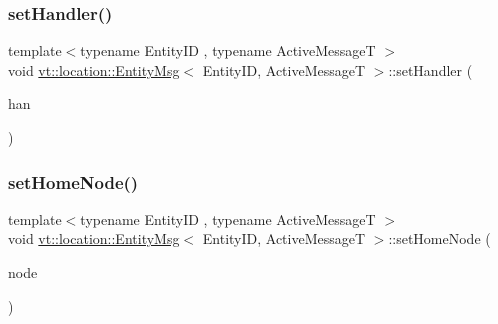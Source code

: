 \mbox{\label{structvt_1_1location_1_1_entity_msg_a343ec9990f43b1f2e0bf6b883e7ae507}} 
\subsubsection{\texorpdfstring{set\+Handler()}{setHandler()}}
{\footnotesize\ttfamily template$<$typename Entity\+ID , typename Active\+MessageT $>$ \\
void \hyperlink{structvt_1_1location_1_1_entity_msg}{vt\+::location\+::\+Entity\+Msg}$<$ Entity\+ID, Active\+MessageT $>$\+::set\+Handler (\begin{DoxyParamCaption}\item[{\hyperlink{namespacevt_af64846b57dfcaf104da3ef6967917573}{Handler\+Type} const \&}]{han }\end{DoxyParamCaption})\hspace{0.3cm}{\ttfamily [inline]}}

\mbox{\label{structvt_1_1location_1_1_entity_msg_af2111f7feda34a83a2132d396647f77f}} 
\subsubsection{\texorpdfstring{set\+Home\+Node()}{setHomeNode()}}
{\footnotesize\ttfamily template$<$typename Entity\+ID , typename Active\+MessageT $>$ \\
void \hyperlink{structvt_1_1location_1_1_entity_msg}{vt\+::location\+::\+Entity\+Msg}$<$ Entity\+ID, Active\+MessageT $>$\+::set\+Home\+Node (\begin{DoxyParamCaption}\item[{\hyperlink{namespacevt_a866da9d0efc19c0a1ce79e9e492f47e2}{Node\+Type} const \&}]{node }\end{DoxyParamCaption})\hspace{0.3cm}{\ttfamily [inline]}}

\mbox{\label{structvt_1_1location_1_1_entity_msg_afd28b1e836177cb58d112b25edce1210}} 
